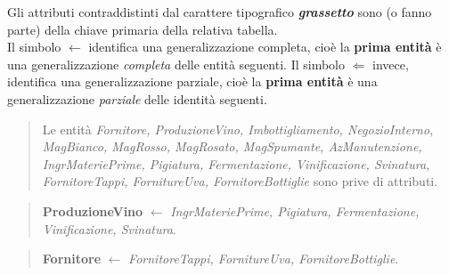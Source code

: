 Gli attributi contraddistinti dal carattere tipografico \textbf{\emph{grassetto}} sono (o fanno parte) della chiave primaria della relativa tabella. \\
Il simbolo $\gets$ identifica una generalizzazione completa, cioè la \textbf{prima entità} è una generalizzazione \emph{completa} delle entità seguenti.
Il simbolo $\Leftarrow$ invece, identifica una generalizzazione parziale, cioè la \textbf{prima entità} è una generalizzazione \emph{parziale} delle identità seguenti.

\begin{verse}
	Le entità \emph{Fornitore, ProduzioneVino, Imbottigliamento, NegozioInterno, MagBianco, MagRosso, MagRosato, MagSpumante, AzManutenzione, IngrMateriePrime, Pigiatura, Fermentazione, Vinificazione, Svinatura, FornitoreTappi, FornitureUva, FornitoreBottiglie} sono prive di attributi.
\end{verse}
\begin{verse}
	\textbf{ProduzioneVino} $\gets$ \emph{IngrMateriePrime, Pigiatura, Fermentazione, Vinificazione, Svinatura}.
\end{verse}
\begin{verse}
	\textbf{Fornitore} $\gets$ \emph{FornitoreTappi, FornitureUva, FornitoreBottiglie}.
\end{verse}

